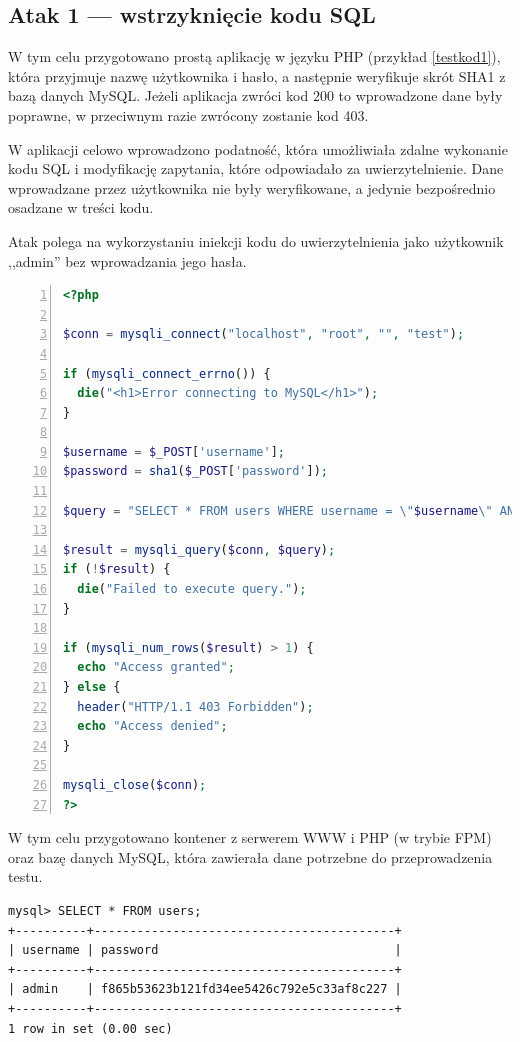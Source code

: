 \documentclass[11pt,a4paper,polish,thesis]{dcsbook}
\begin{document}
\subsection*{Atak 1 --- wstrzyknięcie kodu SQL}
W tym celu przygotowano prostą aplikację w języku PHP (przykład \ref{testkod1}), która przyjmuje nazwę użytkownika i hasło, a następnie weryfikuje skrót SHA1 z bazą danych MySQL. Jeżeli aplikacja zwróci kod $200$ to wprowadzone dane były poprawne, w przeciwnym razie zwrócony zostanie kod 403.

W aplikacji celowo wprowadzono podatność, która umożliwiała zdalne wykonanie kodu SQL i modyfikację zapytania, które odpowiadało za uwierzytelnienie. Dane wprowadzane przez użytkownika nie były weryfikowane, a jedynie bezpośrednio osadzane w treści kodu.

Atak polega na wykorzystaniu iniekcji kodu do uwierzytelnienia jako użytkownik ,,admin'' bez wprowadzania jego hasła.

\begin{lstlisting}[language=PHP,frame=single,label=testkod1,numbers=left,caption=kod aplikacji przygotowanej na potrzeby testów]
<?php

$conn = mysqli_connect("localhost", "root", "", "test");

if (mysqli_connect_errno()) {
  die("<h1>Error connecting to MySQL</h1>");
}

$username = $_POST['username'];
$password = sha1($_POST['password']);

$query = "SELECT * FROM users WHERE username = \"$username\" AND password = \"$password\"";

$result = mysqli_query($conn, $query);
if (!$result) {
  die("Failed to execute query.");
}

if (mysqli_num_rows($result) > 1) {
  echo "Access granted";
} else {
  header("HTTP/1.1 403 Forbidden");
  echo "Access denied";
}

mysqli_close($conn);
?>
\end{lstlisting}

W tym celu przygotowano kontener z serwerem WWW i PHP (w trybie FPM) oraz bazę danych MySQL, która zawierała dane potrzebne do przeprowadzenia testu.

\begin{lstlisting}[frame=single,caption=zawartość testowej bazy danych]
mysql> SELECT * FROM users;
+----------+------------------------------------------+
| username | password                                 |
+----------+------------------------------------------+
| admin    | f865b53623b121fd34ee5426c792e5c33af8c227 |
+----------+------------------------------------------+
1 row in set (0.00 sec)
\end{lstlisting}
\end{document}

